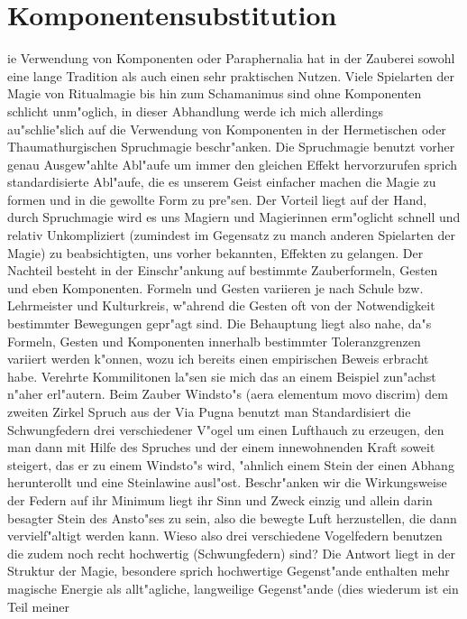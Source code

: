 \documentclass[a5paper,8pt]{book}
\begin{document}
\section{ Komponentensubstitution}

ie Verwendung von Komponenten oder Paraphernalia hat in der Zauberei sowohl eine lange Tradition als auch einen sehr praktischen Nutzen. Viele Spielarten der Magie von Ritualmagie bis hin zum Schamanimus sind ohne Komponenten schlicht unm"oglich, in dieser Abhandlung werde ich mich allerdings au"schlie"slich auf die Verwendung von Komponenten in der Hermetischen oder Thaumathurgischen Spruchmagie beschr"anken.
Die Spruchmagie benutzt vorher genau Ausgew"ahlte Abl"aufe um immer den gleichen Effekt hervorzurufen sprich standardisierte Abl"aufe, die es unserem Geist einfacher machen die Magie zu formen und in die gewollte Form zu pre"sen. Der Vorteil liegt auf der Hand, durch Spruchmagie wird es uns Magiern und Magierinnen erm"oglicht schnell und relativ Unkompliziert (zumindest im Gegensatz zu manch anderen Spielarten der Magie) zu beabsichtigten, uns vorher bekannten, Effekten zu gelangen. Der Nachteil besteht in der Einschr"ankung auf bestimmte Zauberformeln, Gesten und eben Komponenten. Formeln und Gesten variieren je nach Schule bzw. Lehrmeister und Kulturkreis, w"ahrend die Gesten oft von der Notwendigkeit bestimmter Bewegungen gepr"agt sind. Die Behauptung liegt also nahe, da"s Formeln, Gesten und Komponenten innerhalb bestimmter Toleranzgrenzen variiert werden k"onnen, wozu ich bereits einen empirischen Beweis erbracht habe.
Verehrte Kommilitonen la"sen sie mich das an einem Beispiel zun"achst n"aher erl"autern. Beim Zauber Windsto"s (aera elementum movo discrim) dem zweiten Zirkel Spruch aus der Via Pugna benutzt man Standardisiert die Schwungfedern drei verschiedener V"ogel um einen Lufthauch zu erzeugen, den man dann mit Hilfe des Spruches und der einem innewohnenden Kraft soweit steigert, das er zu einem Windsto"s wird, "ahnlich einem Stein der einen Abhang herunterollt und eine Steinlawine ausl"ost. Beschr"anken wir die Wirkungsweise der Federn auf ihr Minimum liegt ihr Sinn und Zweck einzig und allein darin besagter Stein des Ansto"ses zu sein, also die bewegte Luft herzustellen, die dann vervielf"altigt werden kann. Wieso also drei verschiedene Vogelfedern benutzen die zudem noch recht hochwertig (Schwungfedern) sind? Die Antwort liegt in der Struktur der Magie, besondere sprich hochwertige Gegenst"ande enthalten mehr magische Energie als allt"agliche, langweilige Gegenst"ande (dies wiederum ist ein Teil meiner 
\end{document}

